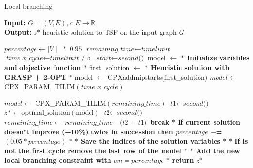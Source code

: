 \begin{algorithm}
    \caption{Local branching}\label{Local branching}
    \hspace*{\algorithmicindent} \textbf{Input:} $G = (V,E) , c : E \rightarrow \mathbb{R}$\\
    \hspace*{\algorithmicindent} \textbf{Output:} $z \text{*} $ heuristic solution to TSP on the input graph $G$
    \begin{algorithmic}[1]
    \State $\textit{percentage} \gets \textit{$|$V $|$ $\ast$ 0.95}$
    \State $\textit{remaining\_time} \gets \textit{timelimit}$
    \State $\textit{time\_x\_cycle} \gets \textit{timelimit / 5}$
    \State $\textit{start} \gets \textit{second()}$
    \State model $ \leftarrow $ \textbf{$\ast$ Initialize variables and objective function $\ast$ }
    \State first\_solution $ \leftarrow $ \textbf{$\ast$ Heuristic solution with GRASP + 2-OPT $\ast$ }
    \State model $ \leftarrow $  CPXaddmipstarts(first\_solution)
	\State $ model \gets $ CPX\_PARAM\_TILIM$(\textit{time\_x\_cycle}) $
	
	\Else \State $ model \gets $ CPX\_PARAM\_TILIM$(\textit{remaining\_time}) $
	\EndIf
	\State $\textit{t1} \gets \textit{second()}$
    	\State $z \text{*} \gets \text{optimal\_solution}(\text{model}) $\;
	\State $\textit{t2} \gets \textit{second()}$
	\State $\textit{remaining\_time} \gets \textit{remaining\_time - (t2 $-$ t1)}$
	\State \textbf{break}
	\EndIf
	\State \textbf{$\ast$ If current solution doesn't improve (+10\%) twice in succession then $ percentage $ $ -$= $ (0.05 \ast percentage)$ $\ast$}
	\State \textbf{$\ast$ Save the indices of the solution variables $\ast$}
	\State \textbf{$\ast$ If is not the first cycle remove the last row of the model $\ast$}
	\State \textbf{$\ast$ Add the new local branching constraint with $\alpha n = percentage $ $\ast$}
    \EndWhile
    \State \textbf{return} $z \text{*} $
    \end{algorithmic}
    \end{algorithm}


